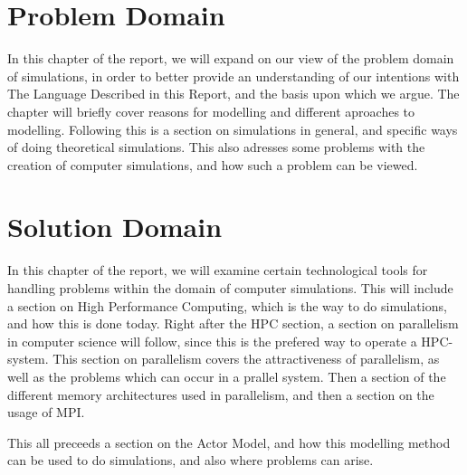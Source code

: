 \chapter{Problem Domain}\label{part:analysis}

In this chapter of the report, we will expand on our view of the problem domain of simulations, in order to better provide an understanding of our intentions with The Language Described in this Report, and the basis upon which we argue. The chapter will briefly cover reasons for modelling and different aproaches to modelling. Following this is a section on simulations in general, and specific ways of doing theoretical simulations. This also adresses some problems with the creation of computer simulations, and how such a problem can be viewed.





\chapter{Solution Domain}

In this chapter of the report, we will examine certain technological tools for handling problems within the domain of computer simulations. This will include a section on High Performance Computing, which is the way to do simulations, and how this is done today. Right after the HPC section, a section on parallelism in computer science will follow, since this is the prefered way to operate a HPC-system. This section on parallelism covers the attractiveness of parallelism, as well as the problems which can occur in a prallel system. Then a section of the different memory architectures used in parallelism, and then a section on the usage of MPI.

This all preceeds a section on the Actor Model, and how this modelling method can be used to do simulations, and also where problems can arise.









